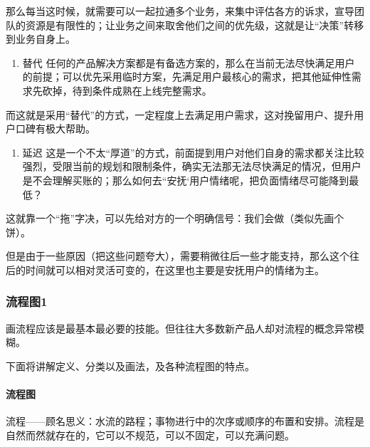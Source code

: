 \documentclass[letterpaper,11pt,english]{sphinxmanual}
\begin{document}
那么每当这时候，就需要可以一起拉通多个业务，来集中评估各方的诉求，宣导团队的资源是有限性的；让业务之间来取舍他们之间的优先级，这就是让“决策”转移到业务自身上。
\begin{enumerate}
%
\setcounter{enumi}{1}
\item {} 
替代
任何的产品解决方案都是有备选方案的，那么在当前无法尽快满足用户的前提；可以优先采用临时方案，先满足用户最核心的需求，把其他延伸性需求先砍掉，待到条件成熟在上线完整需求。

\end{enumerate}

而这就是采用“替代”的方式，一定程度上去满足用户需求，这对挽留用户、提升用户口碑有极大帮助。
\begin{enumerate}
%
\setcounter{enumi}{2}
\item {} 
延迟
这是一个不太“厚道”的方式，前面提到用户对他们自身的需求都关注比较强烈，受限当前的规划和限制条件，确实无法那无法尽快满足的情况，但用户是不会理解买账的；那么如何去“安抚‘用户情绪呢，把负面情绪尽可能降到最低？

\end{enumerate}

这就靠一个“拖”字决，可以先给对方的一个明确信号：我们会做（类似先画个饼）。

但是由于一些原因（把这些问题夸大），需要稍微往后一些才能支持，那么这个往后的时间就可以相对灵活可变的，在这里也主要是安抚用户的情绪为主。


\subsubsection{流程图1\sphinxfootnotemark[195]}
\label{\detokenize{chapter_skill/flow_chart:id1}}\label{\detokenize{chapter_skill/flow_chart::doc}}%
\begin{footnotetext}[195]\sphinxAtStartFootnote
{}
%
\end{footnotetext}\ignorespaces 
画流程应该是最基本最必要的技能。但往往大多数新产品人却对流程的概念异常模糊。

下面将讲解定义、分类以及画法，及各种流程图的特点。


\paragraph{流程图}
\label{\detokenize{chapter_skill/flow_chart:id2}}
流程——顾名思义：水流的路程；事物进行中的次序或顺序的布置和安排。流程是自然而然就存在的，它可以不规范，可以不固定，可以充满问题。
\end{document}
